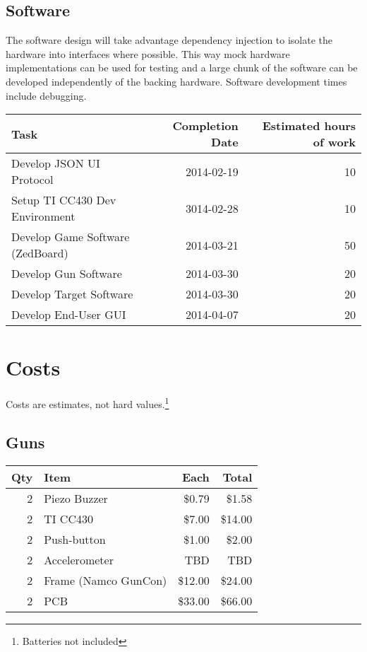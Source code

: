 \documentclass{article}
\begin{document}
\subsection{Software}

The software design will take advantage dependency injection to isolate the hardware into interfaces where possible.
This way mock hardware implementations can be used for testing and a large chunk of the software can be developed
independently of the backing hardware.
Software development times include debugging.

\begin{tabular}{|l|r|r|}
\hline
\textbf{Task} & \textbf{Completion Date} & \textbf{Estimated hours of work} \\
\hline
Develop JSON UI Protocol & 2014-02-19 & 10 \\
\hline
Setup TI CC430 Dev Environment & 3014-02-28 & 10 \\
\hline
Develop Game Software (ZedBoard) & 2014-03-21 & 50 \\
\hline
Develop Gun Software & 2014-03-30 & 20 \\
\hline
Develop Target Software & 2014-03-30 & 20 \\
\hline
Develop End-User GUI & 2014-04-07 & 20 \\
\hline
\end{tabular}

\section{Costs}

Costs are estimates, not hard values.\footnote{Batteries not included}

\subsection{Guns}

\begin{tabular}{|r|l|r|r|}
\hline
\textbf{Qty} & \textbf{Item} & \textbf{Each} & \textbf{Total} \\
\hline
2 & Piezo Buzzer & \$0.79 & \$1.58 \\
\hline
2 & TI CC430 & \$7.00 & \$14.00 \\
\hline
2 & Push-button & \$1.00 & \$2.00 \\
\hline
2 & Accelerometer & TBD & TBD \\
\hline
2 & Frame (Namco GunCon) & \$12.00 & \$24.00 \\
\hline
2 & PCB & \$33.00 & \$66.00 \\
\hline
\end{tabular}
\end{document}

